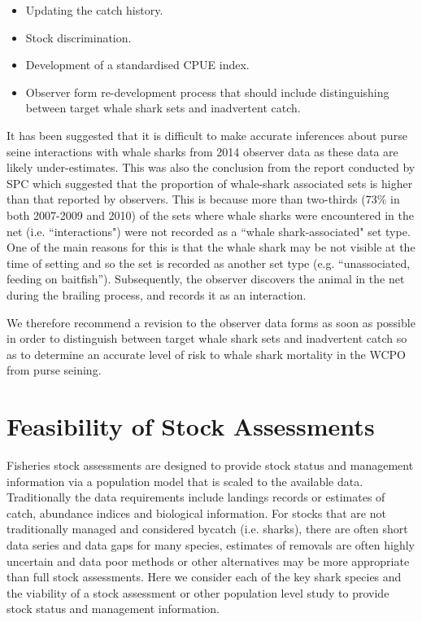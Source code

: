 \documentclass[12pt]{SCreport}
\begin{document}
\begin{itemize}
\item{} Updating the catch history.
\item{} Stock discrimination.
\item{} Development of a standardised CPUE index.
\item{} Observer form re-development process that should include distinguishing between target whale shark sets and inadvertent catch.
\end{itemize}

It has been suggested \citep{Clarke2015_a} that it is difficult to make accurate inferences about purse seine interactions with whale sharks from 2014 observer data as these data are likely under-estimates.  This was also the conclusion from the report conducted by SPC \citep{OFP2011_a} which suggested that the proportion of whale-shark associated sets is higher than that reported by observers. This is because more than two-thirds (73\% in both 2007-2009 and 2010) of the sets where whale sharks were encountered in the net (i.e. ``interactions") were not recorded as a ``whale shark-associated" set type.  One of the main reasons for this is that the whale shark may be not visible at the time of setting and so the set is recorded as another set type (e.g. ``unassociated, feeding on baitfish''). Subsequently, the observer discovers the animal in the net during the brailing process, and records it as an interaction. 

We therefore recommend a revision to the observer data forms as soon as possible in order to distinguish between target whale shark sets and inadvertent catch so as to determine an accurate level of risk to whale shark mortality in the WCPO from purse seining.
  
  
  
      
\section{Feasibility of Stock Assessments}

Fisheries stock assessments are designed to provide stock status and management information via a population model that is scaled to the available data. Traditionally the data requirements include landings records or estimates of catch, abundance indices and biological information. For stocks that are not traditionally managed and considered bycatch (i.e. sharks), there are often short data series and data gaps for many species, estimates of removals are often highly uncertain and data poor methods or other alternatives may be more appropriate than full stock assessments. Here we consider each of the key shark species and the viability of a stock assessment or other population level study to provide stock status and management information.
\end{document}
